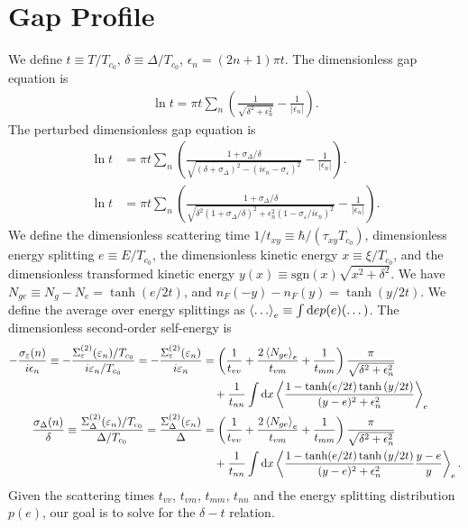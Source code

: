 \documentclass[aps,prl,preprint]{revtex4-2}
\begin{document}
\section{Gap Profile}

We define $t \equiv T/T_{c_0}$, $\delta \equiv \Delta/T_{c_0}$, $\epsilon_n = (2n + 1)\pi t$.
The dimensionless gap equation is
\begin{align}
    \ln{t} = \pi t\sum_n\left(\frac{1}{\sqrt{\delta^2 + \epsilon_n^2}} - \frac{1}{|\epsilon_n|}\right).
\end{align}
The perturbed dimensionless gap equation is
\begin{align}
    \ln{t} & = \pi t \sum_n\left(\frac{1 + \sigma_\Delta/\delta}{\sqrt{(\delta + \sigma_\Delta)^2- (i\epsilon_n - \sigma_\varepsilon)^2}} - \frac{1}{|\epsilon_n|}\right).                          \\
    \ln{t} & = \pi t \sum_n\left(\frac{1 + \sigma_\Delta/\delta}{\sqrt{\delta^2(1 + \sigma_\Delta/\delta)^2 + \epsilon_n^2(1 - \sigma_\varepsilon/i\epsilon_n)^2}} - \frac{1}{|\epsilon_n|}\right).
\end{align}
We define the dimensionless scattering time $1/t_{xy} \equiv \hbar/(\tau_{xy}T_{c_0})$,
dimensionless energy splitting $e \equiv E/T_{c_0}$,
the dimensionless kinetic energy $x \equiv \xi/T_{c_0}$,
and the dimensionless transformed kinetic energy $y(x) \equiv \text{sgn}(x)\sqrt{x^2 + \delta^2}$.
We have $N_{ge} \equiv N_g - N_e = \tanh(e/2t)$, and $n_F(-y) - n_F(y) = \tanh(y/2t)$.
We define the average over energy splittings as $\ev{\dots}_e \equiv \int\dd e p(e)(\dots)$.
The dimensionless second-order self-energy is
\begin{align}
    -\frac{\sigma_\varepsilon(n)}{i\epsilon_n} \equiv -\frac{\Sigma^{(2)}_\varepsilon(\varepsilon_n)/T_{c_0}}{i\varepsilon_n/T_{c_0}}
    = -\frac{\Sigma^{(2)}_\varepsilon(\varepsilon_n)}{i\varepsilon_n}
     & = \left(\frac{1}{t_{vv}} + \frac{2\ev{N_{ge}}_e}{t_{vm}} + \frac{1}{t_{mm}}\right)\frac{\pi}{\sqrt{\delta^2+\epsilon_n^2}}   \nonumber \\
     & \quad + \frac{1}{t_{nn}}\int\dd x\ev{\frac{1-\tanh(e/2t)\tanh{(y/2t)}}{(y-e)^2 + \epsilon_n^2}}_e                                      \\
    \frac{\sigma_\Delta(n)}{\delta} \equiv \frac{\Sigma^{(2)}_\Delta(\varepsilon_n)/T_{c_0}}{\Delta/T_{c_0}}
    = \frac{\Sigma^{(2)}_\Delta(\varepsilon_n)}{\Delta}
     & = \left(\frac{1}{t_{vv}} + \frac{2\ev{N_{ge}}_e}{t_{vm}} + \frac{1}{t_{mm}}\right)\frac{\pi}{\sqrt{\delta^2+\epsilon_n^2}}   \nonumber \\
     & \quad + \frac{1}{t_{nn}}\int\dd x\ev{\frac{1-\tanh(e/2t)\tanh{(y/2t)}}{(y-e)^2 + \epsilon_n^2}\frac{y-e}{y}}_e.
\end{align}
Given the scattering times $t_{vv}$, $t_{vm}$, $t_{mm}$, $t_{nn}$ and the energy splitting distribution $p(e)$, our goal is to solve for the $\delta - t$ relation.
\end{document}
